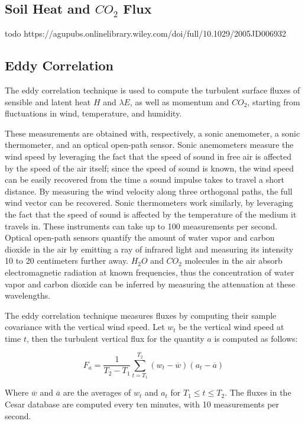\documentclass[12pt]{book}
\begin{document}
\subsection{Soil Heat and $CO_2$ Flux}
todo
https://agupubs.onlinelibrary.wiley.com/doi/full/10.1029/2005JD006932

\subsection{Eddy Correlation}
\label{sec:eddy_correlation}
The eddy correlation technique is used to compute the turbulent surface fluxes of sensible and latent heat $H$ and $\lambda E$, as well as momentum and $CO_2$, starting from fluctuations in wind, temperature, and humidity.

These measurements are obtained with, respectively, a sonic anemometer, a sonic thermometer, and an optical open-path sensor. Sonic anemometers measure the wind speed by leveraging the fact that the speed of sound in free air is affected by the speed of the air itself; since the speed of sound is known, the wind speed can be easily recovered from the time a sound impulse takes to travel a short distance. By measuring the wind velocity along three orthogonal paths, the full wind vector can be recovered. Sonic thermometers work similarly, by leveraging the fact that the speed of sound is affected by the temperature of the medium it travels in. These instruments can take up to 100 measurements per second. Optical open-path sensors quantify the amount of water vapor and carbon dioxide in the air by emitting a ray of infrared light and measuring its intensity 10 to 20 centimeters further away. $H_2O$ and $CO_2$ molecules in the air absorb electromagnetic radiation at known frequencies, thus the concentration of water vapor and carbon dioxide can be inferred by measuring the attenuation at these wavelengths.

The eddy correlation technique measures fluxes by computing their sample covariance with the vertical wind speed. Let $w_t$ be the vertical wind speed at time $t$, then the turbulent vertical flux for the quantity $a$ is computed as follows:

$$
F_a=\frac{1}{T_2-T_1}\sum_{t=T_1}^{T_2}(w_t-\overline{w})(a_t-\overline{a})
$$

Where $\overline{w}$ and $\overline{a}$ are the averages of $w_t$ and $a_t$ for $T_1\leq t\leq T_2$. The fluxes in the Cesar database are computed every ten minutes, with 10 measurements per second.
\end{document}
